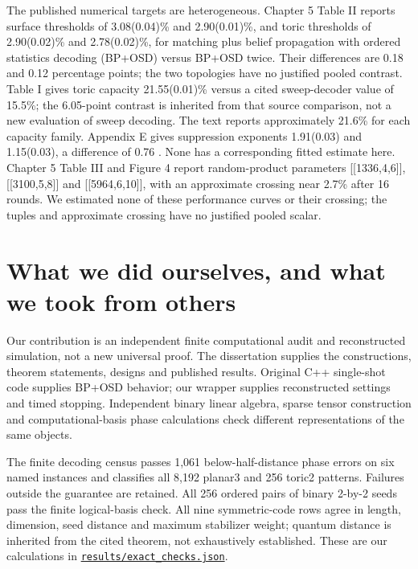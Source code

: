 \documentclass[11pt]{article}
\begin{document}
The published numerical targets are heterogeneous. Chapter 5 Table II reports surface thresholds of 3.08(0.04)\% and 2.90(0.01)\%, and toric thresholds of 2.90(0.02)\% and 2.78(0.02)\%, for matching plus belief propagation with ordered statistics decoding (BP+OSD) versus BP+OSD twice. Their differences are 0.18 and 0.12 percentage points; the two topologies have no justified pooled contrast. Table I gives toric capacity 21.55(0.01)\% versus a cited sweep-decoder value of 15.5\%; the 6.05-point contrast is inherited from that source comparison, not a new evaluation of sweep decoding. The text reports approximately 21.6\% for each capacity family. Appendix E gives suppression exponents 1.91(0.03) and 1.15(0.03), a difference of 0.76 \citep[Ch.~5, Tables I--II, Fig.~3, Appendix E]{quintavalle2022}. None has a corresponding fitted estimate here. Chapter 5 Table III and Figure 4 report random-product parameters [[1336,4,6]], [[3100,5,8]] and [[5964,6,10]], with an approximate crossing near 2.7\% after 16 rounds. We estimated none of these performance curves or their crossing; the tuples and approximate crossing have no justified pooled scalar.

\section{What we did ourselves, and what we took from others}
Our contribution is an independent finite computational audit and reconstructed simulation, not a new universal proof. The dissertation supplies the constructions, theorem statements, designs and published results. Original C++ single-shot code supplies BP+OSD behavior; our wrapper supplies reconstructed settings and timed stopping. Independent binary linear algebra, sparse tensor construction and computational-basis phase calculations check different representations of the same objects.

The finite decoding census passes 1,061 below-half-distance phase errors on six named instances and classifies all 8,192 planar3 and 256 toric2 patterns. Failures outside the guarantee are retained. All 256 ordered pairs of binary 2-by-2 seeds pass the finite logical-basis check. All nine symmetric-code rows agree in length, dimension, seed distance and maximum stabilizer weight; quantum distance is inherited from the cited theorem, not exhaustively established. These are our calculations in \href{https://github.com/alectionary/vibe-math/blob/master/formalization/quintavalle-hgp/results/exact_checks.json}{\nolinkurl{results/exact_checks.json}}.
\end{document}
